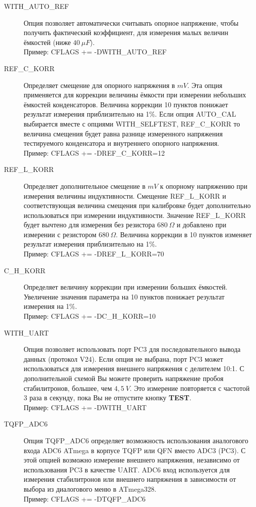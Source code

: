 \begin{description}
  \item[WITH\_AUTO\_REF] Опция позволяет автоматически считывать опорное напряжение, чтобы
получить фактический коэффициент, для измерения малых величин ёмкостей (ниже \(40~\mu F\)).\\
Пример:  CFLAGS += -DWITH\_AUTO\_REF

  \item[REF\_C\_KORR] Определяет смещение для опорного напряжения в \(mV\). Эта опция применяется для 
коррекции величины ёмкости при измерении небольших ёмкостей конденсаторов. Величина коррекции 10 пунктов понижает 
результат измерения приблизительно на 1\%. Если опция AUTO\_CAL выбирается вместе с опциями 
WITH\_SELFTEST, REF\_C\_KORR то величина смещения будет равна разнице измеренного напряжения тестируемого 
конденсатора и внутреннего опорного напряжения.\\
Пример:  CFLAGS += -DREF\_C\_KORR=12

  \item[REF\_L\_KORR] Определяет дополнительное смещение в \(mV\) к опорному напряжению при измерения величины 
индуктивности. Смещение REF\_L\_KORR и соответствующая величина смещения при калибровке будет дополнительно 
использоваться при измерении индуктивности. Значение REF\_L\_KORR будет вычтено для измерения без 
резистора \(680~\Omega\) и добавлено при измерении с резистором \(680~\Omega\).
Величина коррекции в 10 пунктов изменяет результат измерения приблизительно на 1\%.\\
Пример: CFLAGS += -DREF\_L\_KORR=70

  \item[C\_H\_KORR] Определяет величину коррекции при измерении больших ёмкостей. Увеличение значения параметра на 10 пунктов 
понижает результат измерения на 1\%.\\
Пример:  CFLAGS += -DC\_H\_KORR=10

  \item[WITH\_UART] Опция позволяет использовать порт PC3 для последовательного вывода данных (протокол V24). 
Если опция не выбрана, порт PC3 может использоваться для измерения внешнего напряжения  с делителем 10:1. 
С дополнительной схемой Вы можете проверить напряжение пробоя стабилитронов, большее, чем \(4,5~V\). 
Это измерение повторяется с частотой 3 раза в секунду, пока Вы не отпустите кнопку \textbf{ TEST}.\\
Пример: CFLAGS += -DWITH\_UART

  \item[TQFP\_ADC6] Опция TQFP\_ADC6 определяет возможность использования аналогового входа ADC6 ATmega в корпусе 
TQFP или QFN вместо ADC3 (PC3).
С этой опцией возможно измерение внешнего напряжения, независимо от использования PC3 в качестве UART.
ADC6 вход используется для измерения стабилитронов или внешнего напряжения в зависимости от выбора из 
диалогового меню в ATmega328.\\
Пример: CFLAGS += -DTQFP\_ADC6


\end{description}
